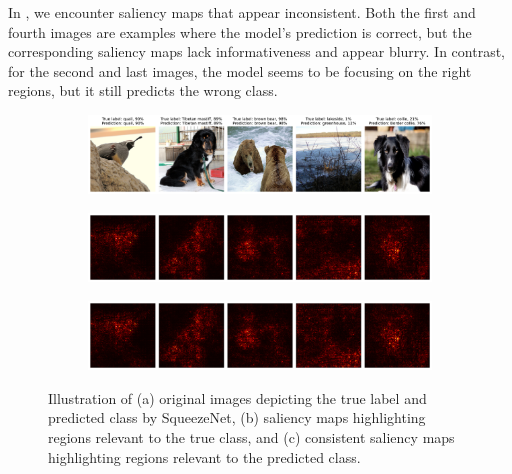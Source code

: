 In , we encounter saliency maps that appear inconsistent. Both the first and fourth images are examples where the model's prediction is correct, but the corresponding saliency maps lack informativeness and appear blurry. In contrast, for the second and last images, the model seems to be focusing on the right regions, but it still predicts the wrong class.

\begin{figure}[H]
    \centering
    \begin{subfigure}{0.95\textwidth}
        \includegraphics[width=\textwidth]{good_images}
        \caption{}
        \label{subfig:good_images1}
    \end{subfigure}
    \begin{subfigure}{0.95\textwidth}
        \includegraphics[width=\textwidth]{good_true_class_saliency}
        \caption{}
        \label{subfig:good_true_class_saliency}
    \end{subfigure}
    \begin{subfigure}{0.95\textwidth}
        \includegraphics[width=\textwidth]{good_predicted_class_saliency}
        \caption{}
        \label{subfig:good_predicted_class_saliency}
    \end{subfigure}
    \caption{Illustration of (a) original images depicting the true label and predicted class by SqueezeNet, (b) saliency maps highlighting regions relevant to the true class, and (c) consistent saliency maps highlighting regions relevant to the predicted class.}
    \label{fig:good_saliency_map}
\end{figure}

